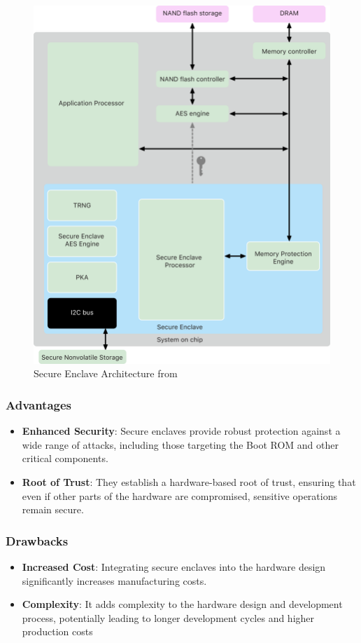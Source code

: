 \begin{figure}[H]
    \centering
    \includegraphics[width=.8\linewidth]{images/enclave.png}
    \caption{Secure Enclave Architecture from\cite{SecureEnclave}}
    \label{fig:secure_enclave}
\end{figure}

\subsubsection{Advantages}

\begin{itemize}
    \item \textbf{Enhanced Security}: Secure enclaves provide robust protection against a wide range of attacks, including those targeting the Boot ROM and other critical components.
    \item \textbf{Root of Trust}: They establish a hardware-based root of trust, ensuring that even if other parts of the hardware are compromised, sensitive operations remain secure.
\end{itemize}
\subsubsection{Drawbacks}

\begin{itemize}
    \item \textbf{Increased Cost}: Integrating secure enclaves into the hardware design significantly increases manufacturing costs.
    \item \textbf{Complexity}: It adds complexity to the hardware design and development process, potentially leading to longer development cycles and higher production costs
\end{itemize}
